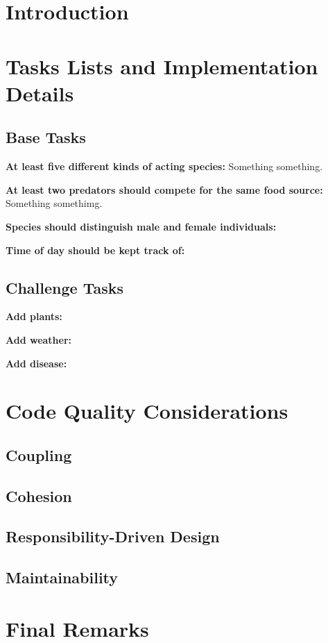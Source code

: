 \documentclass[12pt, a4paper]{scrartcl}
\begin{document}
\begin{multicols}{2}


\section{Introduction}

\section{Tasks Lists and Implementation Details}

\subsection{Base Tasks}

  \noindent \textbf{At least five different kinds of acting species:} Something something.
  
  \noindent \textbf{At least two predators should compete for the same food source:} Something somethimg.
  
  \noindent \textbf{Species should distinguish male and female individuals:}
  
  \noindent \textbf{Time of day should be kept track of:}

\subsection{Challenge Tasks}

  \noindent \textbf{Add plants:}
  
  \noindent \textbf{Add weather:}
  
  \noindent \textbf{Add disease:}

\section{Code Quality Considerations}

\subsection{Coupling}

\subsection{Cohesion}

\subsection{Responsibility-Driven Design}

\subsection{Maintainability}

\section{Final Remarks}

\end{multicols}
\end{document}
